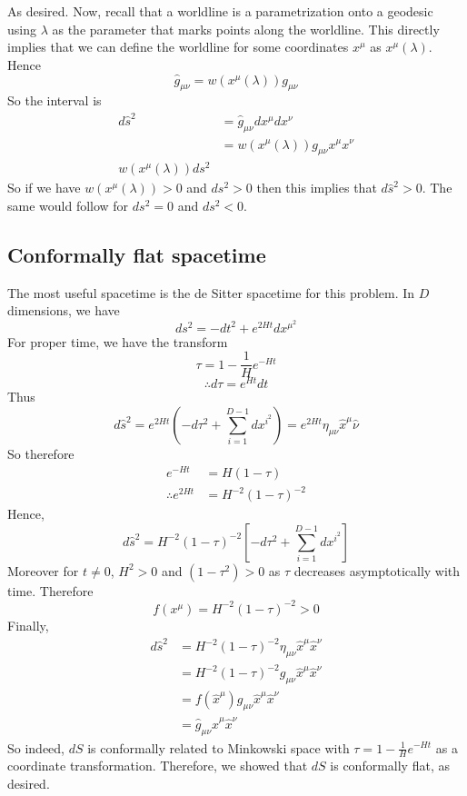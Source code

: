\documentclass{article}
\begin{document}
			As desired. Now, recall that a worldline is a parametrization onto a geodesic using $\lambda$ as the parameter that marks points along the worldline. This directly implies that we can define the worldline for some coordinates $x^\mu$ as $x^\mu (\lambda)$. Hence
			$$ \hat g_{\mu\nu} = w \left( x^\mu \left( \lambda\right)\right) g_{\mu\nu}$$
			So the interval is
			\begin{align*}
				d\hat s^2 &= \hat g_{\mu\nu} dx^\mu dx^\nu \\
				&= w \left( x^\mu \left( \lambda\right)\right) g_{\mu\nu} x^\mu x^\nu \\
				w \left( x^\mu \left( \lambda\right)\right) ds^2
			\end{align*}
			So if we have $	w \left( x^\mu \left( \lambda\right)\right) > 0$ and $ds^2 > 0$ then this implies that $d\hat s^2 >0$. The same would follow for $ds^2 = 0$ and $ds^2 < 0$.
			
		\pagebreak
		\subsection{Conformally flat spacetime}
			The most useful spacetime is the de Sitter spacetime for this problem. In $D$ dimensions, we have
			$$ ds^2 = -dt^2 + e^{2Ht} dx^{\mu^2}$$
			For proper time, we have the transform
			$$ \tau = 1 - \frac{1}{H} e^{-Ht}$$
			$$ \therefore d\tau = e^{Ht}dt$$
			Thus
			$$ d\hat s^2 = e^{2Ht} \left( -d\tau^2 + \sum_{i=1}^{D-1} dx^{i^2} \right) = e^{2Ht} \eta_{\mu\nu} \hat{x}^\mu \hat{\nu}$$
			So therefore
			\begin{align*}
				e^{-Ht} &= H(1-\tau) \\
				\therefore e^{2Ht} &= H^{-2} (1-\tau)^{-2}
			\end{align*}
			Hence,
			$$ d \hat s ^2 = H^{-2}(1-\tau)^{-2} \left[ -d\tau^2 + \sum_{i=1}^{D-1} dx^{i^2} \right]$$
			Moreover for $t\neq0$, $H^2 > 0$ and $ (1-\tau^2)> 0$ as $\tau$ decreases asymptotically with time. Therefore
			$$ f(x^\mu) = H^{-2} (1-\tau)^{-2} >0$$
			Finally,
			\begin{align*}
				d\hat s^2 &= H^{-2} (1-\tau)^{-2} \eta_{\mu\nu} \hat{x}^\mu \hat x^\nu \\
				&= H^{-2} (1-\tau)^{-2} g_{\mu\nu} \hat x^\mu \hat x^\nu \\
				&= f\left(\hat x ^\mu \right) g_{\mu\nu} \hat x^\mu \hat x^\nu \\
				&= \hat g_{\mu\nu} \hat x^\mu \hat x^\nu
			\end{align*}
			So indeed, $dS$ is conformally related to Minkowski space with $\tau = 1 - \frac{1}{H}e^{-Ht}$ as a coordinate transformation. Therefore, we showed that $dS$ is conformally flat, as desired.
\end{document}
